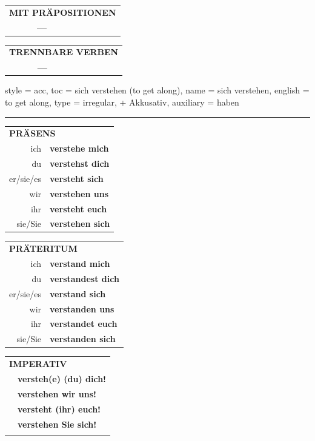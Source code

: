 \begin{verbentry}
\vspace{10pt}

\begin{tabular}{lll}
\multicolumn{3}{l}{\textbf{MIT PRÄPOSITIONEN}}\\
& \textbf{---} & \\
\end{tabular}
\hfill
\begin{tabular}{lll}
\multicolumn{3}{l}{\textbf{TRENNBARE VERBEN}}\\
& \textbf{---} & \\
\end{tabular}
\vspace{-5pt}
\end{verbentry}

\begin{verbentry}{
  style = {acc},
  toc = {sich verstehen (to get along)},
  name = {sich verstehen},
  english = {to get along},
  type = {irregular, + Akkusativ},
  auxiliary = {haben}
}
 
    
       \vspace{5pt}

    \hrule
    
    \vspace{5pt}

  \begin{tabular}{rl}
     \multicolumn{2}{l}{\textbf{PRÄSENS} }\\
    ich & \textbf{verstehe mich}\\
    du & \textbf{verstehst dich}\\
    er/sie/es & \textbf{versteht sich}\\
    wir & \textbf{verstehen uns}\\
    ihr & \textbf{versteht euch}\\
    sie/Sie & \textbf{verstehen sich}\\
  \end{tabular}
  \hfill
     \begin{tabular}{rl}
    \multicolumn{2}{l}{\textbf{PRÄTERITUM} }\\
    ich & \textbf{verstand mich}\\
    du & \textbf{verstandest dich}\\
    er/sie/es & \textbf{verstand sich}\\
    wir & \textbf{verstanden uns}\\
    ihr & \textbf{verstandet euch}\\
    sie/Sie & \textbf{verstanden sich}\\
  \end{tabular}
  \hfill
  \begin{tabular}{rl}
     \multicolumn{2}{l}{\textbf{IMPERATIV} }\\
   & \textbf{versteh(e) (du) dich!}\\
   & \textbf{verstehen wir uns!}\\
   & \textbf{versteht (ihr) euch!}\\
   & \textbf{verstehen Sie sich!}\\
   & \vspace{10pt}
  \end{tabular}


\end{verbentry}
